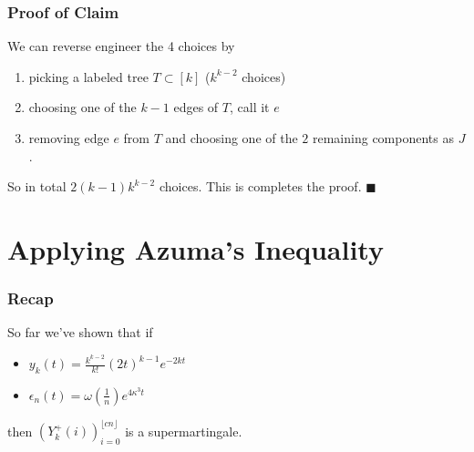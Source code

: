 \documentclass{beamer}
\begin{document}
\begin{frame}
  \frametitle{Proof of Claim}
  We can reverse engineer the 4 choices by \pause
  \begin{enumerate}
    \item picking a labeled tree \(T \subset [k]\) (\(k^{k-2}\) choices) \pause
    \item choosing one of the \(k-1\) edges of \(T\), call it \(e\) \pause
    \item removing edge \(e\) from \(T\) and choosing one of the \(2\) remaining components as \(J\). \pause
\end{enumerate}

So in total \(2(k-1)k^{k-2}\) choices. This is completes the proof. \(\blacksquare\)

\end{frame}

\section{Applying Azuma's Inequality}

\begin{frame}
\frametitle{Recap}
So far we've shown that if \pause
\begin{itemize}
  \item \(y_{k}(t) = \frac{k^{k-2}}{k!}(2t)^{k-1} e^{-2kt}\) \pause 
  \item \(\epsilon_{n}(t) = \omega(\frac{1}{n}) e^{4 \kappa^{3}t}\) \pause
\end{itemize}
then \((Y^{+}_{k}(i))_{i=0}^{\lfloor {cn} \rfloor}\) is a supermartingale.

\end{frame}
\end{document}
